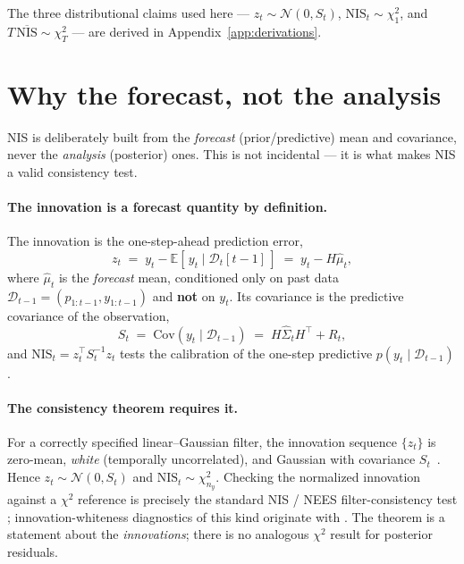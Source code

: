 \documentclass{article}
\newcommand{\E}{\mathbb{E}}
\newcommand{\Norm}{\mathcal{N}}
\newcommand{\Dt}{\mathcal{D}_t}
\begin{document}
The three distributional claims used here --- $z_t \sim \Norm(0, S_t)$,
$\mathrm{NIS}_t \sim \chi^2_1$, and $T\,\overline{\mathrm{NIS}} \sim \chi^2_T$ --- are
derived in Appendix~\ref{app:derivations}.

\section{Why the forecast, not the analysis}
\label{sec:fc-not-analysis}

NIS is deliberately built from the \emph{forecast} (prior/predictive) mean and covariance,
never the \emph{analysis} (posterior) ones. This is not incidental --- it is what makes NIS
a valid consistency test.

\paragraph{The innovation is a forecast quantity by definition.}
The innovation is the one-step-ahead prediction error,
\[
  z_t \;=\; y_t - \E[\,y_t \mid \Dt[t-1]\,] \;=\; y_t - H\hat\mu_t,
\]
where $\hat\mu_t$ is the \emph{forecast} mean, conditioned only on past data
$\mathcal{D}_{t-1}=(p_{1:t-1}, y_{1:t-1})$ and \textbf{not} on $y_t$. Its covariance is the
predictive covariance of the observation,
\[
  S_t \;=\; \mathrm{Cov}(y_t \mid \mathcal{D}_{t-1}) \;=\; H\hat\Sigma_t H^\top + R_t,
\]
and $\mathrm{NIS}_t = z_t^\top S_t^{-1} z_t$ tests the calibration of the one-step
predictive $p(y_t \mid \mathcal{D}_{t-1})$.

\paragraph{The consistency theorem requires it.}
For a correctly specified linear--Gaussian filter, the innovation sequence
$\{z_t\}$ is zero-mean, \emph{white} (temporally uncorrelated), and Gaussian with
covariance $S_t$~\cite{kalman1960,barshalom2001}. Hence $z_t \sim \Norm(0, S_t)$ and
$\mathrm{NIS}_t \sim \chi^2_{n_y}$. Checking the normalized innovation against a $\chi^2$
reference is precisely the standard NIS / NEES filter-consistency test
\cite[Ch.~5]{barshalom2001}; innovation-whiteness diagnostics of this kind originate with
\cite{mehra1970}. The theorem is a statement about the \emph{innovations}; there is no
analogous $\chi^2$ result for posterior residuals.
\end{document}
